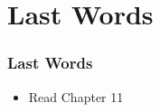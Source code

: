 \documentclass[newPxFont,sthlmFooter,nooffset]{beamer}
\begin{document}
\section{Last Words}

\begin{frame}[t]
  \frametitle{Last Words}

\begin{itemize}
\item Read Chapter 11
\end{itemize}
\end{frame}

\end{document}
